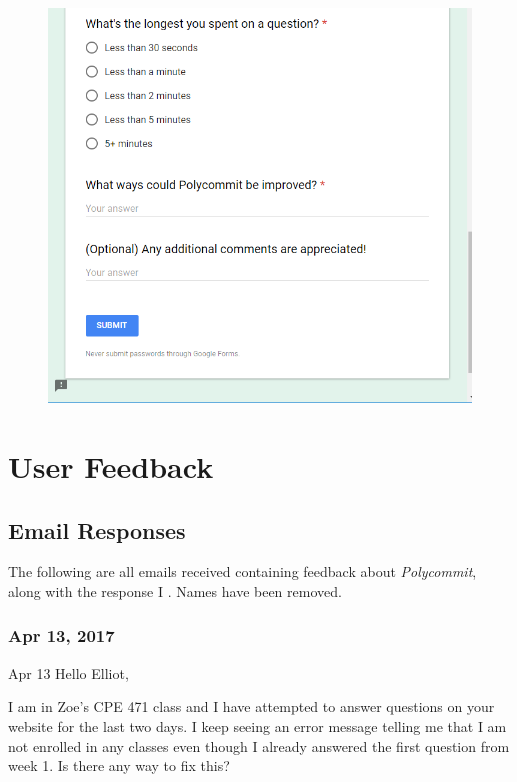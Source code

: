 \begin{appendices}
\begin{figure}[h!]
	\includegraphics[width=1.0\linewidth]{figures/survey3}
	\label{fig:survey3}
\end{figure}

\chapter{User Feedback}

\section{Email Responses}

\par The following are all emails received containing feedback about \textit{Polycommit}, along with the response I . Names have been removed.

\subsection{Apr 13, 2017}
Apr 13
Hello Elliot,

I am in Zoe's CPE 471 class and I have attempted to answer questions on your website for the last two days. I keep seeing an error message telling me that I am not enrolled in any classes even though I already answered the first question from week 1. Is there any way to fix this?


\end{appendices}
